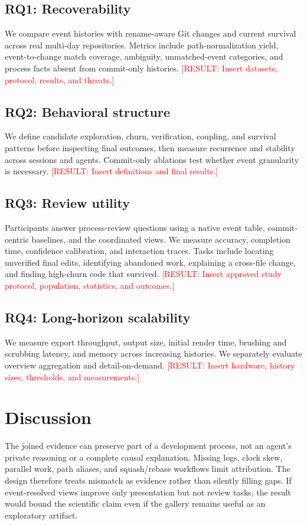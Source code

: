 \documentclass[10pt,twocolumn]{article}
\newcommand{\result}[1]{\textcolor{red}{[RESULT: #1]}}
\begin{document}
\subsection{RQ1: Recoverability}
We compare event histories with rename-aware Git changes and current survival
across real multi-day repositories. Metrics include path-normalization yield,
event-to-change match coverage, ambiguity, unmatched-event categories, and
process facts absent from commit-only histories. \result{Insert datasets,
protocol, results, and threats.}

\subsection{RQ2: Behavioral structure}
We define candidate exploration, churn, verification, coupling, and survival
patterns before inspecting final outcomes, then measure recurrence and
stability across sessions and agents. Commit-only ablations test whether event
granularity is necessary. \result{Insert definitions and final results.}

\subsection{RQ3: Review utility}
Participants answer process-review questions using a native event table,
commit-centric baselines, and the coordinated views. We measure accuracy,
completion time, confidence calibration, and interaction traces. Tasks include
locating unverified final edits, identifying abandoned work, explaining a
cross-file change, and finding high-churn code that survived. \result{Insert
approved study protocol, population, statistics, and outcomes.}

\subsection{RQ4: Long-horizon scalability}
We measure export throughput, output size, initial render time, brushing and
scrubbing latency, and memory across increasing histories. We separately
evaluate overview aggregation and detail-on-demand. \result{Insert hardware,
history sizes, thresholds, and measurements.}

\section{Discussion}
The joined evidence can preserve part of a development process, not an agent's
private reasoning or a complete causal explanation. Missing logs, clock skew,
parallel work, path aliases, and squash/rebase workflows limit attribution.
The design therefore treats mismatch as evidence rather than silently filling
gaps. If event-resolved views improve only presentation but not review tasks,
the result would bound the scientific claim even if the gallery remains useful
as an exploratory artifact.
\end{document}

